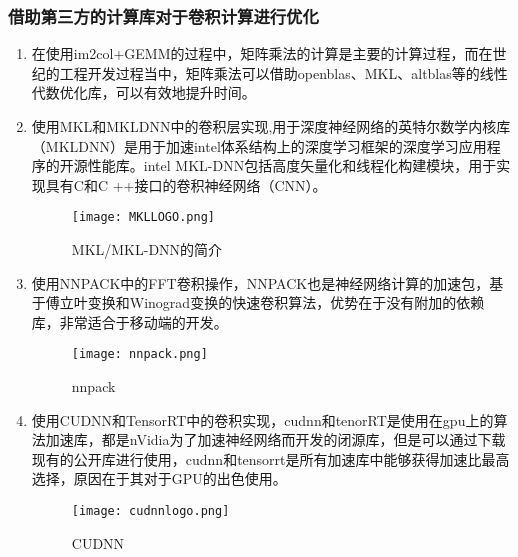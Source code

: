 \subsubsection{借助第三方的计算库对于卷积计算进行优化}
\begin{enumerate}
\item 
在使用im2col+GEMM的过程中，矩阵乘法的计算是主要的计算过程，而在世纪的工程开发过程当中，矩阵乘法可以借助openblas、MKL、altblas等的线性代数优化库，可以有效地提升时间。
\item 使用MKL和MKLDNN\cite{MKL}中的卷积层实现,用于深度神经网络的英特尔数学内核库（MKLDNN）是用于加速intel体系结构上的深度学习框架的深度学习应用程序的开源性能库。intel MKL-DNN包括高度矢量化和线程化构建模块，用于实现具有C和C ++接口的卷积神经网络（CNN）。
\begin{figure}[!ht]
 \centering
	\texttt{[image: MKLLOGO.png]}
	\caption{MKL/MKL-DNN的简介}
\end{figure}
\item 使用NNPACK\cite{NNPACK}中的FFT卷积操作，NNPACK也是神经网络计算的加速包，基于傅立叶变换和Winograd变换的快速卷积算法，优势在于没有附加的依赖库，非常适合于移动端的开发。
\begin{figure}[!ht]
 \centering
	\texttt{[image: nnpack.png]}
	\caption{nnpack}
\end{figure}

\item 使用CUDNN\cite{CUDNN}和TensorRT中的卷积实现，cudnn和tenorRT是使用在gpu上的算法加速库，都是nVidia为了加速神经网络而开发的闭源库，但是可以通过下载现有的公开库进行使用，cudnn和tensorrt是所有加速库中能够获得加速比最高选择，原因在于其对于GPU的出色使用。
\begin{figure}[!ht]
 \centering
	\texttt{[image: cudnnlogo.png]}
	\caption{CUDNN}
\end{figure}
\end{enumerate}


